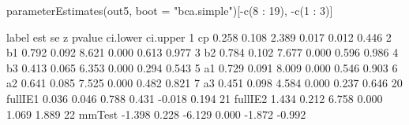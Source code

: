 \begin{Schunk}
\begin{Sinput}
 parameterEstimates(out5, 
                    boot = "bca.simple")[-c(8 : 19), -c(1 : 3)]
\end{Sinput}
\begin{Soutput}
     label    est    se      z pvalue ci.lower ci.upper
1       cp  0.258 0.108  2.389  0.017    0.012    0.446
2       b1  0.792 0.092  8.621  0.000    0.613    0.977
3       b2  0.784 0.102  7.677  0.000    0.596    0.986
4       b3  0.413 0.065  6.353  0.000    0.294    0.543
5       a1  0.729 0.091  8.009  0.000    0.546    0.903
6       a2  0.641 0.085  7.525  0.000    0.482    0.821
7       a3  0.451 0.098  4.584  0.000    0.237    0.646
20 fullIE1  0.036 0.046  0.788  0.431   -0.018    0.194
21 fullIE2  1.434 0.212  6.758  0.000    1.069    1.889
22  mmTest -1.398 0.228 -6.129  0.000   -1.872   -0.992
\end{Soutput}
\end{Schunk}
